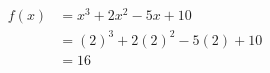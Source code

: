 \documentclass[a4paper]{article}
\begin{document}
    \begin{equation*}
    \begin{split}
    f(x) &= x^3 + 2x^2 - 5x + 10\\
    &= (2)^3 + 2(2)^2 - 5(2) + 10\\
    &= 16
    \end{split}
    \end{equation*}
\end{document}
